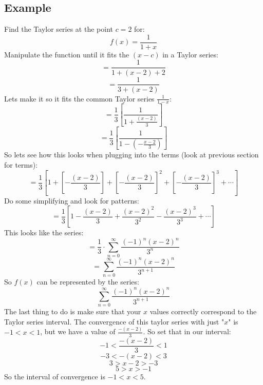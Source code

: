 \documentclass{report}
\begin{document}
    \subsection{Example}
        Find the Taylor series at the point \(c = 2\) for:
        \[f(x) = \frac{1}{1+x}\]
        Manipulate the function until it fits the \((x - c)\) in a Taylor series:
        \[= \frac{1}{1+(x - 2) + 2}\]
        \[= \frac{1}{3 + (x - 2)}\]
        Lets make it so it fits the common Taylor series \(\frac{1}{1-x}\):
        \[= \frac{1}{3} \left[ \frac{1}{1 + \frac{(x-2)}{3}} \right]\]
        \[= \frac{1}{3} \left[ \frac{1}{1- (- \frac{x-2}{3})} \right]\]
        So lets see how this looks when plugging into the terms (look at previous section for terms):
        \[= \frac{1}{3} \left[ 1 + \left[ - \frac{(x-2)}{3}\right] + \left[ - \frac{(x-2)}{3} \right]^2 + \left[ - \frac{(x-2)}{3} \right]^3 + \cdots \right] \]
        Do some simplifying and look for patterns:
        \[= \frac{1}{3} \left[ 1 - \frac{(x-2)}{3} + \frac{(x-2)^2}{3^2} - \frac{(x-2)^3}{3^3} + \cdots \right]\]
        This looks like the series:
        \[= \frac{1}{3} \cdot \sum_{n=0}^{\infty}  \frac{(-1)^n(x-2)^n}{3^n}\]
        \[= \sum_{n=0}^{\infty}  \frac{(-1)^n(x-2)^n}{3^{n+1}}\]
        So \(f(x)\) can be represented by the series:
        \[\sum_{n=0}^{\infty}  \frac{(-1)^n(x-2)^n}{3^{n+1}}\]
        The last thing to do is make sure that your \(x\) values correctly correspond to the Taylor series interval.
        The convergence of this taylor series with just "\(x\)" is \(-1 < x < 1\), but we have a value of \(\frac{-(x-2)}{3}\).
        So set that in our interval:
        \[-1 < \frac{-(x-2)}{3} < 1\]
        \[-3 < -(x-2) < 3\]
        \[3 > x-2 > -3\]
        \[5 > x > -1\]
        So the interval of convergence is \(-1 < x < 5\).
    
\end{document}
